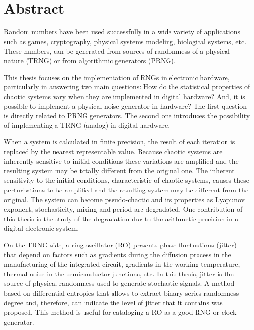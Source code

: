 \chapter{Abstract}

Random numbers have been used successfully in a wide variety of applications such as games, cryptography, physical systems modeling, biological systems, etc.
These numbers, can be generated from sources of randomness of a physical nature (TRNG) or from algorithmic generators (PRNG).

This thesis focuses on the implementation of RNGs in electronic hardware, particularly in answering two main questions: How do the statistical properties of chaotic systems vary when they are implemented in digital hardware? And, it is possible to implement a physical noise generator in hardware? The first question is directly related to PRNG generators.
The second one introduces the possibility of implementing a TRNG (analog) in digital hardware.

When a system is calculated in finite precision, the result of each iteration is replaced by the nearest representable value.
Because chaotic systems are inherently sensitive to initial conditions these variations are amplified and the resulting system may be totally different from the original one.
The inherent sensitivity to the initial conditions, characteristic of chaotic systems, causes these perturbations to be amplified and the resulting system may be different from the original.
The system can become pseudo-chaotic and its properties as Lyapunov exponent, stochasticity, mixing and period are degradated.
One contribution of this thesis is the study of the degradation due to the arithmetic precision in a digital electronic system.

On the TRNG side, a ring oscillator (RO) presents phase fluctuations (jitter) that depend on factors such as gradients during the diffusion process in the manufacturing of the integrated circuit, gradients in the working temperature, thermal noise in the semiconductor junctions, etc.
In this thesis, jitter is the source of physical randomness used to generate stochastic signals.
A method based on differential entropies that allows to extract binary series randomness degree and, therefore, can indicate the level of jitter that it contains was proposed.
This method is useful for cataloging a RO as a good RNG or clock generator.